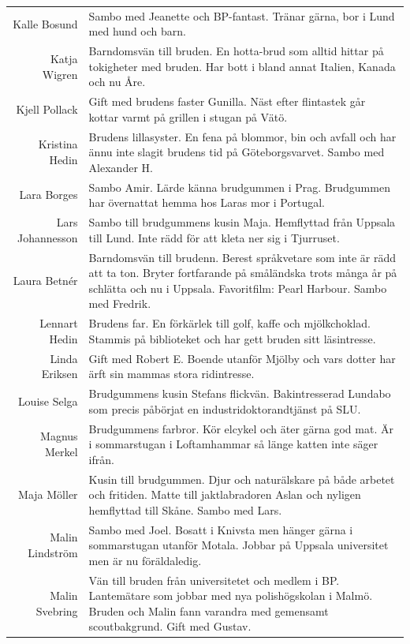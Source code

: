 \documentclass[a5paper]{article}
\begin{document}
\begin{longtable}[l]{N|L}
				Kalle Bosund	&	Sambo med Jeanette och BP-fantast. Tränar gärna, bor i Lund med hund och barn.	\\
				Katja Wigren	&	Barndomsvän till bruden. En hotta-brud som alltid hittar på tokigheter med bruden. Har bott i bland annat Italien, Kanada och nu Åre.	\\
				Kjell Pollack	&	Gift med brudens faster Gunilla. Näst efter flintastek går kottar varmt på grillen i stugan på Vätö.	\\
				Kristina Hedin	&	Brudens lillasyster. En fena på blommor, bin och avfall och har ännu inte slagit brudens tid på Göteborgsvarvet. Sambo med Alexander H.	\\
				Lara Borges	&	Sambo Amir. Lärde känna brudgummen i Prag. Brudgummen har övernattat hemma hos Laras mor i Portugal.	\\
				Lars Johannesson	&	Sambo till brudgummens kusin Maja. Hemflyttad från Uppsala till Lund. Inte rädd för att kleta ner sig i Tjurruset.	\\
				Laura Betnér	&	Barndomsvän till brudenn. Berest språkvetare som inte är rädd att ta ton. Bryter fortfarande på småländska trots många år på schlätta och nu i Uppsala. Favoritfilm: Pearl Harbour. Sambo med Fredrik.	\\
				Lennart Hedin	&	Brudens far. En förkärlek till golf, kaffe och mjölkchoklad. Stammis på biblioteket och har gett bruden sitt läsintresse.	\\
				Linda Eriksen	&	Gift med Robert E. Boende utanför Mjölby och vars dotter har ärft sin mammas stora ridintresse.	\\
				Louise Selga	&	Brudgummens kusin Stefans flickvän. Bakintresserad Lundabo som precis påbörjat en industridoktorandtjänst på SLU. 	\\
				Magnus Merkel	&	Brudgummens farbror. Kör elcykel och äter gärna god mat. Är i sommarstugan i Loftamhammar så länge katten inte säger ifrån.	\\
				Maja Möller	&	Kusin till brudgummen. Djur och naturälskare på både arbetet och fritiden. Matte till jaktlabradoren Aslan och nyligen hemflyttad till Skåne. Sambo med Lars.	\\
				Malin Lindström	&	Sambo med Joel. Bosatt i Knivsta men hänger gärna i sommarstugan utanför Motala. Jobbar på Uppsala universitet men är nu föräldaledig.	\\
				Malin Svebring	&	Vän till bruden från universitetet och medlem i BP. Lantemätare som jobbar med nya polishögskolan i Malmö. Bruden och Malin fann varandra med gemensamt scoutbakgrund. Gift med Gustav.	\\

\end{longtable}
\end{document}
